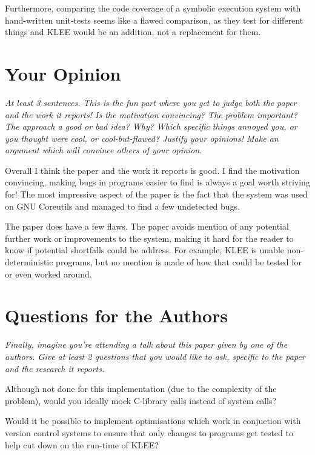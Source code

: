 \documentclass[11pt]{article}
\begin{document}
Furthermore, comparing the code coverage of a symbolic execution system with
hand-written unit-tests seems like a flawed comparison, as they test for
different things and KLEE would be an addition, not a replacement for them.

\section*{Your Opinion}

\textsl{At least 3 sentences. This is the fun part where you get to judge both
the paper and the work it reports! Is the motivation convincing? The problem
important? The approach a good or bad idea? Why? Which specific things annoyed
you, or you thought were cool, or cool-but-flawed? Justify your opinions! Make
an argument which will convince others of your opinion.}

Overall I think the paper and the work it reports is good. I find the
motivation convincing, making bugs in programs easier to find is always a goal
worth striving for! The most impressive aspect of the paper is the fact that
the system was used on GNU Coreutils and managed to find a few undetected bugs.

The paper does have a few flaws. The paper avoids mention of any potential
further work or improvements to the system, making it hard for the reader to
know if potential shortfalls could be address. For example, KLEE is unable
non-deterministic programs, but no mention is made of how that could be tested
for or even worked around.

\section*{Questions for the Authors}

\textsl{Finally, imagine you're attending a talk about this paper given by one
of the authors. Give at least 2 questions that you would like to ask, specific
to the paper and the research it reports.}

Although not done for this implementation (due to the complexity of the
problem), would you ideally mock C-library calls instead of system calls?

Would it be possible to implement optimisations which work in conjuction with
version control systems to ensure that only changes to programs get tested to
help cut down on the run-time of KLEE?




\end{document}
